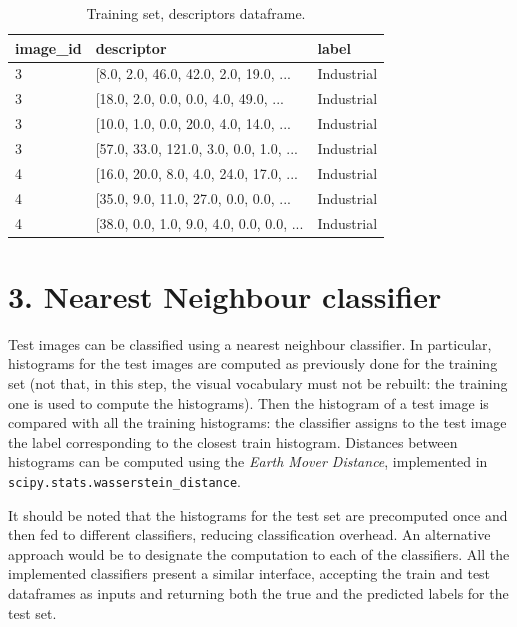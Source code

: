 \documentclass[12pt]{article}
\begin{document}
	\begin{table}[H] 
		\centering
		\caption*{Training set, descriptors dataframe.}
		\begin{tabular}{lll}
			\toprule
      image\_id & descriptor & label \\
      \midrule
      3 &  [8.0, 2.0, 46.0, 42.0, 2.0, 19.0, ...    &  Industrial \\
      3 &  [18.0, 2.0, 0.0, 0.0, 4.0, 49.0, ...     &  Industrial \\
      3 &  [10.0, 1.0, 0.0, 20.0, 4.0, 14.0, ...    &  Industrial \\
      3 &  [57.0, 33.0, 121.0, 3.0, 0.0, 1.0, ...   &  Industrial \\
      4 &  [16.0, 20.0, 8.0, 4.0, 24.0, 17.0, ...   &  Industrial \\
      4 &  [35.0, 9.0, 11.0, 27.0, 0.0, 0.0, ...    &  Industrial \\
      4 &  [38.0, 0.0, 1.0, 9.0, 4.0, 0.0, 0.0, ... &  Industrial \\
			\bottomrule
		\end{tabular}
	\end{table}



  \section*{3. Nearest Neighbour classifier}

  Test images can be classified using a nearest neighbour classifier. In particular, histograms for the test images are computed as previously done for the training set (not that, in this step, the visual vocabulary must not be rebuilt: the training one is used to compute the histograms). Then the histogram of a test image is compared with all the training histograms: the classifier assigns to the test image the label corresponding to the closest train histogram. Distances between histograms can be computed using the \textit{Earth Mover Distance}, implemented in \texttt{scipy.stats.wasserstein\_distance}.
  
  It should be noted that the histograms for the test set are precomputed once and then fed to different classifiers, reducing classification overhead. An alternative approach would be to designate the computation to each of the classifiers. All the implemented classifiers present a similar interface, accepting the train and test dataframes as inputs and returning both the true and the predicted labels for the test set.
\end{document}
